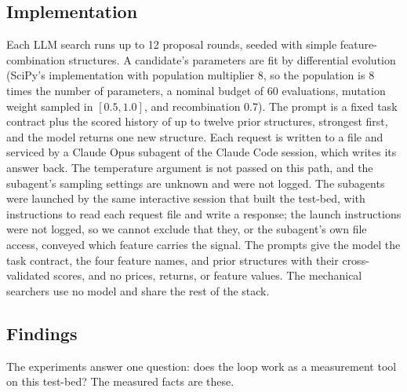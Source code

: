 \documentclass[11pt]{article}
\begin{document}
\subsection{Implementation}
\label{sec:impl}

Each LLM search runs up to 12 proposal rounds, seeded with simple feature-combination structures. A
candidate's parameters are fit by differential evolution (SciPy's implementation with population
multiplier 8, so the population is 8 times the number of parameters, a nominal budget of 60 evaluations,
mutation weight sampled in $[0.5,1.0]$, and recombination 0.7). The prompt is a fixed task contract plus
the scored history of up to twelve prior structures, strongest first, and the model returns one new
structure. Each request is written to a file and serviced by a Claude Opus subagent of the Claude Code
session, which writes its answer back. The temperature argument is not passed on this path, and the
subagent's sampling settings are unknown and were not logged. The subagents were launched by the same
interactive session that built the test-bed, with instructions to read each request file and write a
response; the launch instructions were not logged, so we cannot exclude that they, or the subagent's own
file access, conveyed which feature carries the signal. The prompts give
the model the task contract, the four feature names, and prior structures with their cross-validated
scores, and no prices, returns, or feature values. The mechanical searchers use no model and share the
rest of the stack.

\subsection{Findings}
\label{sec:findings}

The experiments answer one question: does the loop work as a measurement tool on this test-bed? The
measured facts are these.
\end{document}
